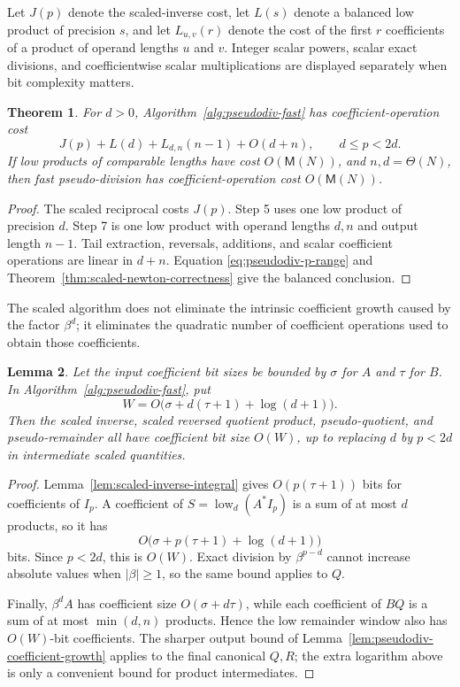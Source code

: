 \documentclass[11pt]{book}
\newtheorem{theorem}{Theorem}[section]
\newtheorem{lemma}[theorem]{Lemma}
\theoremstyle{definition}
\begin{document}
Let $J(p)$ denote the scaled-inverse cost, let $L(s)$ denote a balanced low
product of precision $s$, and let
$L_{u,v}(r)$ denote the cost of the first $r$ coefficients of a product of
operand lengths $u$ and $v$.  Integer scalar powers, scalar exact divisions,
and coefficientwise scalar multiplications are displayed separately when bit
complexity matters.

\begin{theorem}\label{thm:pseudodiv-fast-complexity}
For $d>0$, Algorithm~\ref{alg:pseudodiv-fast} has coefficient-operation cost
\begin{equation}\label{eq:pseudodiv-fast-cost}
 J(p)+L(d)+L_{d,n}(n-1)+O(d+n),
 \qquad d\le p<2d.
\end{equation}
If low products of comparable lengths have cost $O(\mathsf M(N))$, and
$n,d=\Theta(N)$, then fast pseudo-division has coefficient-operation cost
$O(\mathsf M(N))$.
\end{theorem}

\begin{proof}
The scaled reciprocal costs $J(p)$.  Step 5 uses one low product of precision
$d$.  Step 7 is one low product with operand lengths $d,n$ and output length
$n-1$.  Tail extraction, reversals, additions, and scalar coefficient
operations are linear in $d+n$.  Equation \eqref{eq:pseudodiv-p-range} and
Theorem~\ref{thm:scaled-newton-correctness} give the balanced conclusion.
\end{proof}

The scaled algorithm does not eliminate the intrinsic coefficient growth
caused by the factor $\beta^d$; it eliminates the quadratic number of
coefficient operations used to obtain those coefficients.

\begin{lemma}\label{lem:pseudodiv-fast-intermediate-growth}
Let the input coefficient bit sizes be bounded by $\sigma$ for $A$ and $\tau$
for $B$.  In Algorithm~\ref{alg:pseudodiv-fast}, put
\[
 W=O\bigl(\sigma+d(\tau+1)+\log(d+1)\bigr).
\]
Then the scaled inverse, scaled reversed quotient product, pseudo-quotient,
and pseudo-remainder all have coefficient bit size $O(W)$, up to replacing
$d$ by $p<2d$ in intermediate scaled quantities.
\end{lemma}

\begin{proof}
Lemma~\ref{lem:scaled-inverse-integral} gives
$O(p(\tau+1))$ bits for coefficients of $I_p$.  A coefficient of
$S=\operatorname{low}_d(A^*I_p)$ is a sum of at most $d$ products, so it has
\[
 O\bigl(\sigma+p(\tau+1)+\log(d+1)\bigr)
\]
bits.  Since $p<2d$, this is $O(W)$.  Exact division by
$\beta^{p-d}$ cannot increase absolute values when $|\beta|\ge1$, so the same
bound applies to $Q$.

Finally, $\beta^dA$ has coefficient size
$O(\sigma+d\tau)$, while each coefficient of $BQ$ is a sum of at most
$\min(d,n)$ products.  Hence the low remainder window also has $O(W)$-bit
coefficients.  The sharper output bound of
Lemma~\ref{lem:pseudodiv-coefficient-growth} applies to the final canonical
$Q,R$; the extra logarithm above is only a convenient bound for product
intermediates.
\end{proof}
\end{document}
